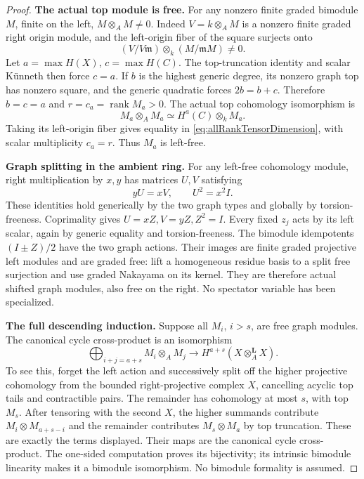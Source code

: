 \documentclass[11pt,a4paper]{article}
\theoremstyle{named}\newtheorem{finding}{Finding}[section]
\theoremstyle{definition}\newtheorem{definition}[finding]{Definition}
\theoremstyle{remark}\newtheorem{remark}[finding]{Remark}
\begin{document}
\begin{proof}
\par\smallskip\noindent\textbf{The actual top module is free.}\quad
For any nonzero finite graded bimodule \(M\), finite
on the left, \(M\otimes_AM\ne0\).
Indeed \(V=k\otimes_AM\) is a nonzero finite graded
right origin module, and the left-origin fiber
of the square surjects onto
\[
 (V/V\mathfrak m)\otimes_k(M/\mathfrak mM)\ne0.
\]
Let \(a=\max H(X)\), \(c=\max H(C)\).
The top-truncation identity and scalar K\"unneth
then force \(c=a\). If \(b\) is the highest generic
degree, its nonzero graph top has nonzero square,
and the generic quadratic forces \(2b=b+c\).
Therefore \(b=c=a\) and \(r=c_a=\operatorname{rank}M_a>0\).
The actual top cohomology isomorphism is
\[
 M_a\otimes_AM_a\simeq H^a(C)\otimes_kM_a.
\]
Taking its left-origin fiber gives equality in
\eqref{eq:allRankTensorDimension}, with scalar
multiplicity \(c_a=r\). Thus \(M_a\) is left-free.

\par\smallskip\noindent\textbf{Graph splitting in the ambient ring.}\quad
For any left-free cohomology module, right multiplication
by \(x,y\) has matrices \(U,V\) satisfying
\[
                         yU=xV,\qquad U^2=x^2I.
\]
These identities hold generically by the two graph
types and globally by torsion-freeness.
Coprimality gives \(U=xZ,V=yZ,Z^2=I\).
Every fixed \(z_j\) acts by its left scalar, again
by generic equality and torsion-freeness.
The bimodule idempotents \((I\pm Z)/2\) have
the two graph actions. Their images are finite
graded projective left modules and are graded free:
lift a homogeneous residue basis to a split free
surjection and use graded Nakayama on its kernel.
They are therefore actual shifted graph modules,
also free on the right.
No spectator variable has been specialized.

\par\smallskip\noindent\textbf{The full descending induction.}\quad
Suppose all \(M_i\), \(i>s\), are free graph modules.
The canonical cycle cross-product is an isomorphism
\begin{equation}\label{eq:allRankNearTopKunneth}
 \bigoplus_{i+j=a+s}M_i\otimes_AM_j
       \longrightarrow H^{a+s}(X\otimes_A^{\mathbf L}X).
\end{equation}
To see this, forget the left action and successively
split off the higher projective cohomology from the
bounded right-projective complex \(X\), cancelling
acyclic top tails and contractible pairs. The remainder
has cohomology at most \(s\), with top \(M_s\).
After tensoring with the second \(X\), the higher
summands contribute \(M_i\otimes M_{a+s-i}\) and
the remainder contributes \(M_s\otimes M_a\) by
top truncation. These are exactly the terms displayed.
Their maps are the canonical cycle cross-product.
The one-sided computation proves its bijectivity;
its intrinsic bimodule linearity makes it a bimodule
isomorphism. No bimodule formality is assumed.


\end{proof}
\end{document}
